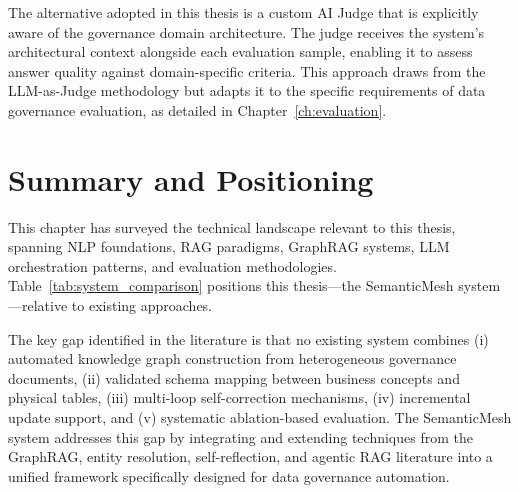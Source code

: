 The alternative adopted in this thesis is a custom AI Judge that is explicitly aware of the governance domain architecture. The judge receives the system's architectural context alongside each evaluation sample, enabling it to assess answer quality against domain-specific criteria. This approach draws from the LLM-as-Judge methodology but adapts it to the specific requirements of data governance evaluation, as detailed in Chapter~\ref{ch:evaluation}.

\section{Summary and Positioning}
\label{sec:rw:summary}

This chapter has surveyed the technical landscape relevant to this thesis, spanning NLP foundations, RAG paradigms, GraphRAG systems, LLM orchestration patterns, and evaluation methodologies. Table~\ref{tab:system_comparison} positions this thesis---the SemanticMesh system---relative to existing approaches.

\begin{table}[htbp]
\centering
\caption{Feature comparison of related systems versus SemanticMesh (this thesis).}
\label{tab:system_comparison}
\end{table}

The key gap identified in the literature is that no existing system combines (i) automated knowledge graph construction from heterogeneous governance documents, (ii) validated schema mapping between business concepts and physical tables, (iii) multi-loop self-correction mechanisms, (iv) incremental update support, and (v) systematic ablation-based evaluation. The SemanticMesh system addresses this gap by integrating and extending techniques from the GraphRAG, entity resolution, self-reflection, and agentic RAG literature into a unified framework specifically designed for data governance automation.
